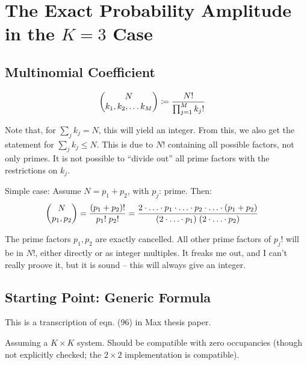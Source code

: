 \documentclass[
	english,
	a4paper,
	fontsize=10pt,
	parskip=half,
	titlepage=true,
	DIV=12,
	final
]{scrreprt}
\title{\myTitle}
\author{\myName}
\date{\today}
\begin{document}
\tableofcontents
\newpage

\chapter{The Exact Probability Amplitude in the $K=3$ Case}
\section{Multinomial Coefficient}
\begin{align}
	\mqty(N \\ k_1, k_2, \ldots k_M)
&\coloneqq
	\frac
		{N!}
		{\prod_{j=1}^{M} k_j!}
\end{align}

Note that, for $\sum_j k_j = N$, this will yield an integer. From this, we also get the statement for $\sum_j k_j \leq N$. This is due to $N!$ containing all possible factors, not only primes. It is not possible to \enquote{divide out} all prime factors with the restrictions on $k_j$.

Simple case: Assume $N = p_1 + p_2$, with $p_j$: prime. Then:
\begin{align}
	\mqty(N \\ p_1, p_2)
&=
	\frac{(p_1 + p_2)!}{p_1! \; p_2!}
=
	\frac
		{2 \cdot \ldots \cdot p_1 \cdot \ldots \cdot p_2 \cdot \ldots \cdot (p_1 + p_2)}
		{(2 \cdot \ldots \cdot p_1) \; (2 \cdot \ldots \cdot p_2)}
\end{align}

The prime factors $p_1, p_2$ are exactly cancelled. All other prime factors of $p_j!$ will be in $N!$, either directly or as integer multiples. It freaks me out, and I can't really proove it, but it is sound -- this will always give an integer.


\section{Starting Point: Generic Formula}
This is a transcription of eqn. (96) in Max thesis paper.

Assuming a $K \times K$ system. Should be compatible with zero occupancies (though not explicitly checked; the $2 \times 2$ implementation is compatible).
\end{document}

